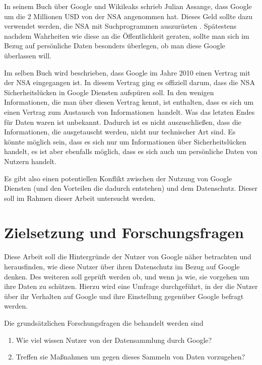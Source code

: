 In seinem Buch über Google und Wikileaks schrieb Julian Assange, dass Google um die 2 Millionen USD von der NSA angenommen hat. Dieses Geld sollte dazu verwendet werden, die NSA mit Suchprogrammen auszurüsten \citet{assangebook}. Spätestens nachdem Wahrheiten wie diese an die Öffentlichkeit geraten, sollte man sich im Bezug auf persönliche Daten besonders überlegen, ob man diese Google überlassen will.

Im selben Buch wird beschrieben, dass Google im Jahre 2010 einen Vertrag mit der NSA eingegangen ist. In diesem Vertrag ging es offiziell darum, dass die NSA Sicherheitslücken in Google Diensten aufspüren soll. In den wenigen Informationen, die man über diesen Vertrag kennt, ist enthalten, dass es sich um einen Vertrag zum \glqq Austausch von Informationen\grqq\ handelt. Was das letzten Endes für Daten waren ist unbekannt. Dadurch ist es nicht auszuschließen, dass die Informationen, die ausgetauscht werden, nicht nur technischer Art sind. Es könnte möglich sein, dass es sich nur um Informationen über Sicherheitslücken handelt, es ist aber ebenfalls möglich, dass es sich auch um persönliche Daten von Nutzern handelt.

Es gibt also einen potentiellen Konflikt zwischen der Nutzung von Google Diensten (und den Vorteilen die dadurch entstehen) und dem Datenschutz. Dieser soll im Rahmen dieser Arbeit untersucht werden.

\section{Zielsetzung und Forschungsfragen}
\label{sec:questions}
Diese Arbeit soll die Hintergründe der Nutzer von Google näher betrachten und herausfinden, wie diese Nutzer über ihren Datenschutz im Bezug auf Google denken. Des weiteren soll geprüft werden ob, und wenn ja wie, sie vorgehen um ihre Daten zu schützen. Hierzu wird eine Umfrage durchgeführt, in der die Nutzer über ihr Verhalten auf Google und ihre Einstellung gegenüber Google befragt werden.

Die grundsätzlichen Forschungsfragen die behandelt werden sind
\begin{enumerate}
\item Wie viel wissen Nutzer von der Datensammlung durch Google?
\item Treffen sie Maßnahmen um gegen dieses Sammeln von Daten vorzugehen?
\end{enumerate}